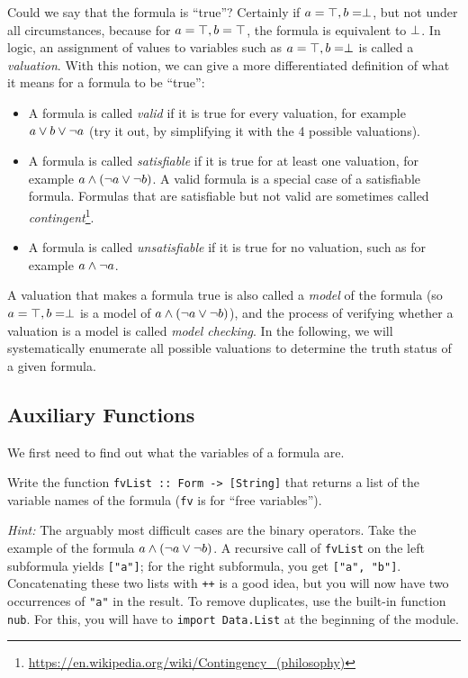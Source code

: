 \documentclass[english]{article}
\begin{document}
Could we say that the formula is ``true''? Certainly if $a=\top, b=\perp$, but
not under all circumstances, because for $a=\top, b=\top$, the formula is
equivalent to $\perp$. In logic, an assignment of values to variables such as
$a=\top, b=\perp$ is called a \emph{valuation}. With this notion, we can
give a more differentiated definition of what it means for a formula to be
``true'':
\begin{itemize}
\item A formula is called \emph{valid} if it is true for every valuation, for
  example $a \lor b \lor \lnot a$ (try it out, by simplifying it with the 4
  possible valuations). 
\item A formula is called \emph{satisfiable} if it is true for at least one
  valuation, for example $a \land (\lnot a \lor \lnot b)$. A valid formula is a
  special case of a satisfiable formula. Formulas that are satisfiable but not
  valid are sometimes called
  \emph{contingent}\footnote{\url{https://en.wikipedia.org/wiki/Contingency_(philosophy)}}. 
\item A formula is called \emph{unsatisfiable} if it is true for no valuation,
  such as for example $a \land \lnot a$.
\end{itemize}
A valuation that makes a formula true is also called a \emph{model} of the
formula (so $a=\top, b=\perp$ is a model of $a \land (\lnot a \lor \lnot b)$),
and the process of verifying whether a valuation is a model is called
\emph{model checking}. In the following, we will systematically enumerate all
possible valuations to determine the truth status of a given formula.


\subsection{Auxiliary Functions}\label{sec:evaluating_aux}

We  first need to find out what the variables of a formula are.

\begin{exo}\label{exo:fvList}
Write the function  \texttt{fvList :: Form -> [String]} that returns a list of the
variable names of the formula (\texttt{fv} is for ``free variables''). 

\emph{Hint:} The arguably most difficult cases are the binary operators. Take
the example of the formula $a \land (\lnot a \lor \lnot b)$. A recursive call of
\texttt{fvList} on the left subformula yields \texttt{["a"]}; for the right
subformula, you get \texttt{["a", "b"]}. Concatenating these two lists with
\texttt{++} is a good idea, but you will now have two occurrences of
\texttt{"a"} in the result. To remove duplicates, use the built-in function
\texttt{nub}. For this, you will have to \texttt{import Data.List} at the
beginning of the module.
\end{exo}
\end{document}
